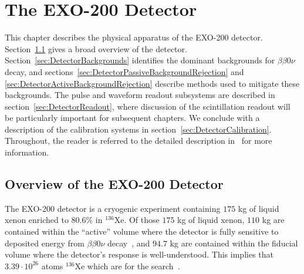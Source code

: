 \renewcommand{\thechapter}{3}
\chapter{The EXO-200 Detector}
\label{ch:EXO200Detector}

This chapter describes the physical apparatus of the EXO-200 detector.  Section~\ref{sec:DetectorOverview} gives a broad overview of the detector.  Section~\ref{sec:DetectorBackgrounds} identifies the dominant backgrounds for $\beta\beta 0\nu$ decay, and sections~\ref{sec:DetectorPassiveBackgroundRejection} and \ref{sec:DetectorActiveBackgroundRejection} describe methods used to mitigate these backgrounds.  The pulse and waveform readout subsystems are described in section~\ref{sec:DetectorReadout}, where discussion of the scintillation readout will be particularly important for subsequent chapters.  We conclude with a description of the calibration systems in section~\ref{sec:DetectorCalibration}.  Throughout, the reader is referred to the detailed description in~\cite{detectorPartI} for more information.

\section{Overview of the EXO-200 Detector}\label{sec:DetectorOverview}

The EXO-200 detector is a cryogenic experiment containing $175$ kg of liquid xenon enriched to $80.6\%$ in $^{136}$Xe.  Of those $175$ kg of liquid xenon, $110$ kg are contained within the ``active'' volume where the detector is fully sensitive to deposited energy from $\beta\beta 0\nu$ decay~\cite{detectorPartI}, and $94.7$ kg are contained within the fiducial volume where the detector's response is well-understood.  This implies that $3.39 \cdot 10^{26}$ atoms $^{136}$Xe which are for the search~\cite{NewEXObb0nPaper_2014}.

